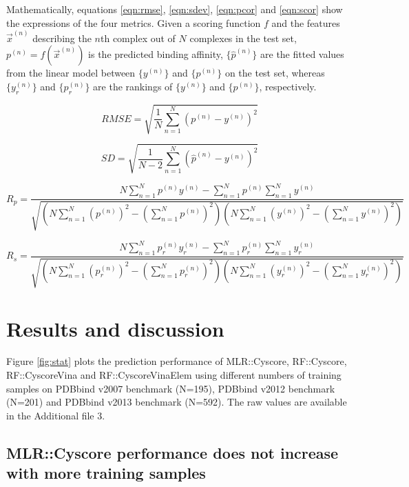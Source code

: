 \documentclass[linenumbers]{bmcart}
\begin{document}
Mathematically, equations \ref{eqn:rmse}, \ref{eqn:sdev}, \ref{eqn:pcor} and \ref{eqn:scor} show the expressions of the four metrics. Given a scoring function $f$ and the features $\overrightarrow{x}^{(n)}$ describing the $n$th complex out of $N$ complexes in the test set, $p^{(n)}=f(\overrightarrow{x}^{(n)})$ is the predicted binding affinity, $\{\hat{p}^{(n)}\}$ are the fitted values from the linear model between $\{y^{(n)}\}$ and $\{p^{(n)}\}$ on the test set, whereas $\{y_r^{(n)}\}$ and $\{p_r^{(n)}\}$ are the rankings of $\{y^{(n)}\}$ and $\{p^{(n)}\}$, respectively.

\begin{equation}
RMSE = \sqrt{\frac{1}{N}\sum_{n=1}^N(p^{(n)}-y^{(n)})^2}
\label{eqn:rmse}
\end{equation}

\begin{equation}
SD = \sqrt{\frac{1}{N-2}\sum_{n=1}^N(\hat{p}^{(n)}-y^{(n)})^2}
\label{eqn:sdev}
\end{equation}

\begin{equation}
R_p = \frac{N\sum_{n=1}^Np^{(n)}y^{(n)}-\sum_{n=1}^Np^{(n)}\sum_{n=1}^Ny^{(n)}}{\sqrt{(N\sum_{n=1}^N(p^{(n)})^2-(\sum_{n=1}^Np^{(n)})^2)(N\sum_{n=1}^N(y^{(n)})^2-(\sum_{n=1}^Ny^{(n)})^2)}}
\label{eqn:pcor}
\end{equation}

\begin{equation}
R_s = \frac{N\sum_{n=1}^Np_r^{(n)}y_r^{(n)}-\sum_{n=1}^Np_r^{(n)}\sum_{n=1}^Ny_r^{(n)}}{\sqrt{(N\sum_{n=1}^N(p_r^{(n)})^2-(\sum_{n=1}^Np_r^{(n)})^2)(N\sum_{n=1}^N(y_r^{(n)})^2-(\sum_{n=1}^Ny_r^{(n)})^2)}}
\label{eqn:scor}
\end{equation}

\section*{Results and discussion}

Figure \ref{fig:stat} plots the prediction performance of MLR::Cyscore, RF::Cyscore, RF::CyscoreVina and RF::CyscoreVinaElem using different numbers of training samples on PDBbind v2007 benchmark (N=195), PDBbind v2012 benchmark (N=201) and PDBbind v2013 benchmark (N=592). The raw values are available in the Additional file 3.

\subsection*{MLR::Cyscore performance does not increase with more training samples}
\end{document}

